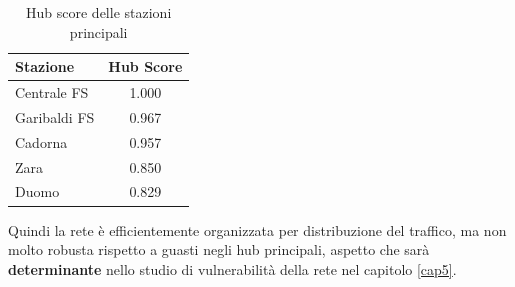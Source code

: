 \vspace{1em}
\begin{table}[h!]
\centering
\begin{tabular}{l c}
\hline
\textbf{Stazione} & \textbf{Hub Score} \\
\hline
Centrale FS & 1.000\\
Garibaldi FS & 0.967\\
Cadorna & 0.957\\
Zara & 0.850\\
Duomo & 0.829\\
\hline
\end{tabular}
\caption{Hub score delle stazioni principali}
\label{tab: Hub score delle stazioni principali}
\end{table}
\vspace{1em}

Quindi la rete è efficientemente organizzata per distribuzione del traffico, ma non molto robusta rispetto a guasti negli hub principali, aspetto che sarà \textbf{determinante} nello studio di vulnerabilità della rete nel capitolo \ref{cap5}.

